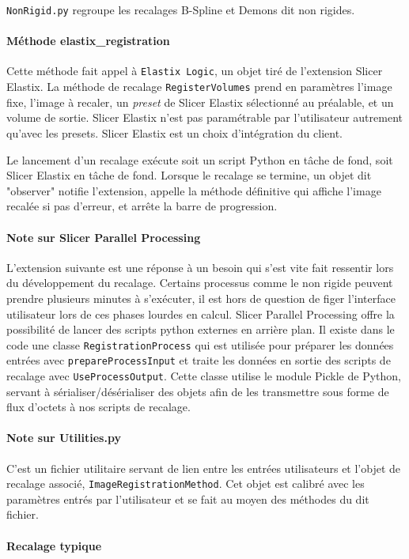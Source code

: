 \documentclass{article}
\newcommand{\subsubsubsection}[1]{\paragraph{#1}\par\noindent\bigskip}
\begin{document}
{{        \texttt{NonRigid.py} regroupe les recalages B-Spline et Demons dit non rigides.

        \bigskip
        \subsubsubsection{Méthode elastix\_registration}

        Cette méthode fait appel à \texttt{Elastix Logic}, un objet tiré de l'extension Slicer Elastix. La méthode de recalage \texttt{RegisterVolumes} prend en paramètres l'image fixe, l'image à recaler, un \textit{preset} de Slicer Elastix sélectionné au préalable, et un volume de sortie. Slicer Elastix n'est pas paramétrable par l'utilisateur autrement qu'avec les presets. Slicer Elastix est un choix d'intégration du client.

        \bigskip

        Le lancement d'un recalage exécute soit un script Python en tâche de fond, soit Slicer Elastix en tâche de fond. Lorsque le recalage se termine, un objet dit "observer" notifie l'extension, appelle la méthode définitive qui affiche l'image recalée si pas d'erreur, et arrête la barre de progression.

        \bigskip
        \subsubsubsection{Note sur Slicer Parallel Processing}

        L'extension suivante est une réponse à un besoin qui s'est vite fait ressentir lors du développement du recalage. Certains processus comme le non rigide peuvent prendre plusieurs minutes à s'exécuter, il est hors de question de figer l'interface utilisateur lors de ces phases lourdes en calcul. Slicer Parallel Processing offre la possibilité de lancer des scripts python externes en arrière plan. Il existe dans le code une classe \texttt{RegistrationProcess} qui est utilisée pour préparer les données entrées avec \texttt{prepareProcessInput} et traite les données en sortie des scripts de recalage avec \texttt{UseProcessOutput}. Cette classe utilise le module Pickle de Python, servant à sérialiser/désérialiser des objets afin de les transmettre sous forme de flux d'octets à nos scripts de recalage.

        \bigskip
        \subsubsubsection{Note sur Utilities.py}

        C'est un fichier utilitaire servant de lien entre les entrées utilisateurs et l'objet de recalage associé, \texttt{ImageRegistrationMethod}. Cet objet est calibré avec les paramètres entrés par l'utilisateur et se fait au moyen des méthodes du dit fichier.

        \bigskip
        \subsubsubsection{Recalage typique}

}}
\end{document}

